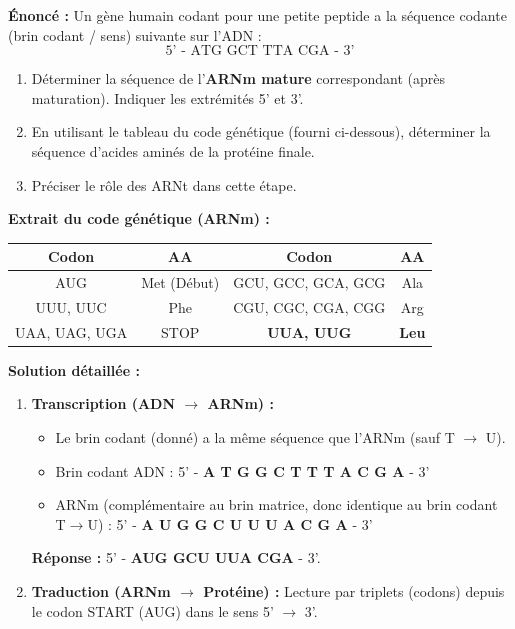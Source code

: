 \documentclass[11pt]{article}
\begin{document}
\begin{exoresolu}
    \textbf{Énoncé :} Un gène humain codant pour une petite peptide a la séquence codante (brin codant / sens) suivante sur l'ADN :
    \[ \text{5' - ATG GCT TTA CGA - 3'} \]
    \begin{enumerate}
        \item Déterminer la séquence de l'\textbf{ARNm mature} correspondant (après maturation). Indiquer les extrémités 5' et 3'.
        \item En utilisant le tableau du code génétique (fourni ci-dessous), déterminer la séquence d'acides aminés de la protéine finale.
        \item Préciser le rôle des ARNt dans cette étape.
    \end{enumerate}
    \textbf{Extrait du code génétique (ARNm) :}
    \begin{center}
        \begin{tabular}{|c|c|c|c|}\hline
            \rowcolor{popblueL} \textbf{Codon} & \textbf{AA} & \textbf{Codon} & \textbf{AA} \\ \hline
            AUG & Met (Début) & GCU, GCC, GCA, GCG & Ala \\
            UUU, UUC & Phe & CGU, CGC, CGA, CGG & Arg \\
            UAA, UAG, UGA & STOP & \textbf{UUA, UUG} & \textbf{Leu} \\ \hline
        \end{tabular}
    \end{center}
    \tcblower
    \textbf{Solution détaillée :}
    \begin{enumerate}
        \item \textbf{Transcription (ADN $\rightarrow$ ARNm) :}
            \begin{itemize}
                \item Le brin codant (donné) a la même séquence que l'ARNm (sauf T $\rightarrow$ U).
                \item Brin codant ADN : 5' - \textbf{A T G G C T T T A C G A} - 3'
                \item ARNm (complémentaire au brin matrice, donc identique au brin codant T$\rightarrow$U) : 5' - \textbf{A U G G C U U U A C G A} - 3'
            \end{itemize}
            \textbf{Réponse :} 5' - \textbf{AUG GCU UUA CGA} - 3'.
        \item \textbf{Traduction (ARNm $\rightarrow$ Protéine) :} Lecture par triplets (codons) depuis le codon START (AUG) dans le sens 5' $\rightarrow$ 3'.

\end{enumerate}
\end{exoresolu}
\end{document}
